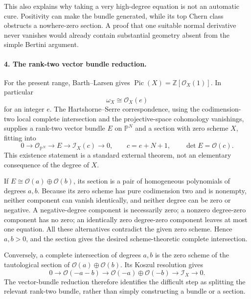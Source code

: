 \documentclass[11pt]{article}
\begin{document}
This also explains why taking a very high-degree equation is not an automatic cure. Positivity can make the bundle generated, while its top Chern class obstructs a nowhere-zero section. A proof that one suitable normal derivative never vanishes would already contain substantial geometry absent from the simple Bertini argument.

\paragraph{4. The rank-two vector bundle reduction.}
For the present range, Barth--Larsen gives $\operatorname{Pic}(X)=\mathbb Z[\mathcal O_X(1)]$. In particular
\[
 \omega_X\cong\mathcal O_X(e)
\]
for an integer $e$. The Hartshorne--Serre correspondence, using the codimension-two local complete intersection and the projective-space cohomology vanishings, supplies a rank-two vector bundle $E$ on $\mathbb P^N$ and a section with zero scheme $X$, fitting into
\[
 0\longrightarrow\mathcal O_{\mathbb P^N}
 \longrightarrow E\longrightarrow\mathcal I_X(c)\longrightarrow0,
 \qquad c=e+N+1,\qquad\det E=\mathcal O(c).
\]
This existence statement is a standard external theorem, not an elementary consequence of the degree of $X$.

If $E\cong\mathcal O(a)\oplus\mathcal O(b)$, its section is a pair of homogeneous polynomials of degrees $a,b$. Because its zero scheme has pure codimension two and is nonempty, neither component can vanish identically, and neither degree can be zero or negative. A negative-degree component is necessarily zero; a nonzero degree-zero component has no zero; an identically zero degree-zero component leaves at most one equation. All these alternatives contradict the given zero scheme. Hence $a,b>0$, and the section gives the desired scheme-theoretic complete intersection.

Conversely, a complete intersection of degrees $a,b$ is the zero scheme of the tautological section of $\mathcal O(a)\oplus\mathcal O(b)$. Its Koszul resolution gives
\[
 0\longrightarrow\mathcal O(-a-b)
 \longrightarrow\mathcal O(-a)\oplus\mathcal O(-b)
 \longrightarrow\mathcal I_X\longrightarrow0.
\]
The vector-bundle reduction therefore identifies the difficult step as splitting the relevant rank-two bundle, rather than simply constructing a bundle or a section.
\end{document}
